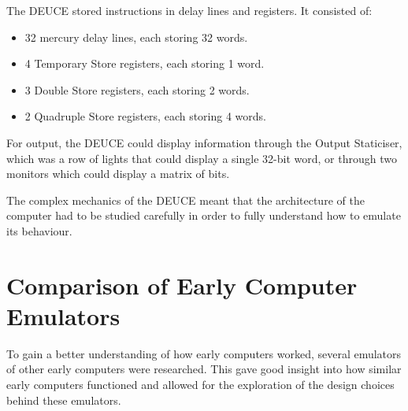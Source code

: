 \documentclass{l4proj}
\begin{document}
The DEUCE stored instructions in delay lines and registers. It consisted of:
\begin{itemize}
	\item 32 mercury delay lines, each storing 32 words.
	\item 4 Temporary Store registers, each storing 1 word.
	\item 3 Double Store registers, each storing 2 words.
	\item 2 Quadruple Store registers, each storing 4 words.
\end{itemize}	
For output, the DEUCE could display information through the Output Staticiser, which was a row of lights that could display a single 32-bit word, or through two monitors which could display a matrix of bits.

The complex mechanics of the DEUCE meant that the architecture of the computer had to be studied carefully in order to fully understand how to emulate its behaviour.

\section{Comparison of Early Computer Emulators}
To gain a better understanding of how early computers worked, several emulators of other early computers were researched. This gave good insight into how similar early computers functioned and allowed for the exploration of the design choices behind these emulators.
\end{document}
